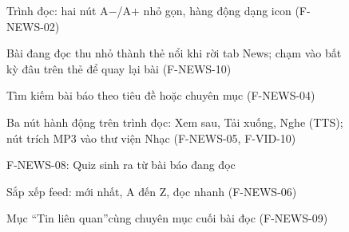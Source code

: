 \begin{figure}[H]
\centering
{}
\caption{\small Trình đọc: hai nút \mbox{A$-$/A$+$} nhỏ gọn, hàng động dạng icon (F-NEWS-02)}
\end{figure}
\begin{figure}[H]
\centering
{}
\caption{\small Bài đang đọc thu nhỏ thành thẻ nổi khi rời tab News; chạm vào bất kỳ đâu trên thẻ để quay lại bài (F-NEWS-10)}
\end{figure}
\begin{figure}[H]
\centering
{}
\caption{\small Tìm kiếm bài báo theo tiêu đề hoặc chuyên mục (F-NEWS-04)}
\end{figure}
\begin{figure}[H]
\centering
{}
\caption{\small Ba nút hành động trên trình đọc: Xem sau, Tải xuống, Nghe (TTS); nút trích MP3 vào thư viện Nhạc (F-NEWS-05, F-VID-10)}
\end{figure}
\begin{figure}[H]
\centering
{}
\caption{\small F-NEWS-08: Quiz sinh ra từ bài báo đang đọc}
\end{figure}
\begin{figure}[H]
\centering
{}
\caption{\small Sắp xếp feed: mới nhất, A đến Z, đọc nhanh (F-NEWS-06)}
\end{figure}
\begin{figure}[H]
\centering
{}
\caption{\small Mục ``Tin liên quan''cùng chuyên mục cuối bài đọc (F-NEWS-09)}
\end{figure}

